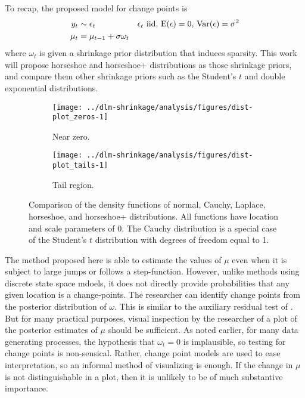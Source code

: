 To recap, the proposed model for change points is
\begin{align}
  \label{dlm:eq:16}
  y_{t} & \sim \epsilon_{t} & \text{$\epsilon_{t}$ iid, $\operatorname{E}(\epsilon) = 0$, $\operatorname{Var}(\epsilon) = \sigma^{2}$} \\
  \mu_{t} &= \mu_{t - 1} + \sigma \omega_{t}
\end{align}
where $\omega_{t}$ is given a shrinkage prior distribution that induces sparsity.
This work will propose horseshoe and horseshoe+ distributions as those shrinkage priors, and compare them other shrinkage priors such as the Student's $t$ and double exponential distributions.


\begin{figure}[!htpb]
 \begin{subfigure}[b]{\linewidth}
   \texttt{[image: ../dlm-shrinkage/analysis/figures/dist-plot\_zeros-1]}
   \caption{Near zero.}
 \end{subfigure}
 \begin{subfigure}[b]{\linewidth}
    \texttt{[image: ../dlm-shrinkage/analysis/figures/dist-plot\_tails-1]}
    \caption{Tail region.}
 \end{subfigure}
  \caption[Comparison of the density functions of normal, Cauchy, Laplace, horseshoe, and horseshoe+ distributions.]{
    Comparison of the density functions of normal, Cauchy, Laplace, horseshoe, and horseshoe+ distributions.
    All functions have location and scale parameters of 0.
    The Cauchy distribution is a special case of the Student's $t$ distribution with degrees of freedom equal to 1.
  }
  \label{dlm:fig:density}
\end{figure}


The method proposed here is able to estimate the values of $\mu$ even when it is subject to large jumps or follows a step-function. 
However, unlike methods using discrete state space mdoels, it does not directly provide probabilities that any given location is a change-points.
The researcher can identify change points from the posterior distribution of $\omega$.
This is similar to the auxiliary residual test of \textcite{DeJongPenzer1998}.
But for many practical purposes, visual inspection by the researcher of a plot of the posterior estimates of $\mu$ should be sufficient.
As noted earlier, for many data generating processes, the hypothesis that $\omega_{t} = 0$ is implausible, so testing for change points is non-sensical.
Rather, change point models are used to ease interpretation, so an informal method of visualizing is enough.
If the change in $\mu$ is not distinguishable in a plot, then it is unlikely to be of much substantive importance.

